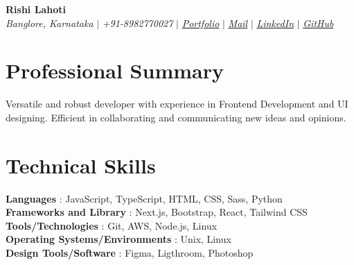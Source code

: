 \documentclass[letterpaper,10pt]{article}
\newcommand{\sectionspace}{
\vspace{-20pt}
}
\newcommand{\subheadingtitlevspace}{
\vspace{-3pt}
}
\newcommand{\titleItem}[1]{
  \textbf{#1}
}
\begin{document}

\begin{flushleft}
    \textbf{\large Rishi Lahoti} \\    
    \textit{Banglore, Karnataka} $|$ 
    \textit{+91-8982770027} $|$  
    \href{https://rishilahoti.works/}{{\textit{Portfolio}}} $|$
    \href{mailto:rishilahoti99@gmail.com}{{\textit{Mail}}} $|$ 
    \href{https://www.linkedin.com/in/rishi-lahoti-665889166/}{{\textit{LinkedIn}}} $|$
    \href{https://github.com/rishilahoti}{{\textit{GitHub}}}
    \vspace{-8pt}
\end{flushleft}


\section{Professional Summary}
\vspace{-3pt}
\begin{itemize}[leftmargin=0.15in, label={}]
    {\item{
     {Versatile and robust developer with experience in Frontend Development and UI designing. Efficient in collaborating and communicating new ideas and opinions.} \\      
    }}
 \end{itemize}
 \sectionspace




\section{Technical Skills}
\subheadingtitlevspace
 \begin{itemize}[leftmargin=0.15in, label={}]
    {\item{
     \titleItem{Languages}{: JavaScript, TypeScript, HTML, CSS, Sass, Python} \\
     \titleItem{Frameworks and Library}{: Next.js, Bootstrap, React, Tailwind CSS} \\
     \titleItem{Tools/Technologies}{: Git, AWS, Node.js, Linux} \\
     \titleItem{Operating Systems/Environments}{: Unix, Linux} \\
     \titleItem{Design Tools/Software}{: Figma, Ligthroom, Photoshop}
    }}
 \end{itemize}
\sectionspace
\end{document}
